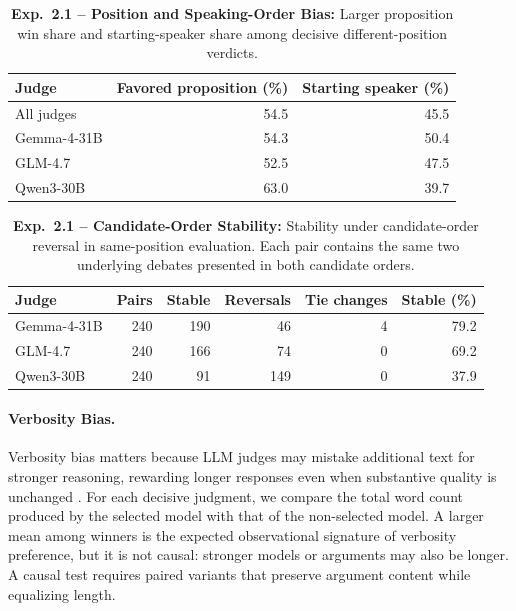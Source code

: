 \documentclass{article}
\begin{document}
\begin{table}[!t]
  \centering
  \caption{\textbf{Exp.~2.1 -- Position and Speaking-Order Bias:} Larger proposition win share and starting-speaker share among decisive different-position verdicts.}
  \label{tab:current-position-order}
  \begin{tabular}{p{8em}rr}
    \toprule
    Judge & Favored proposition (\%) & Starting speaker (\%) \\
    \midrule
    All judges & 54.5 & 45.5 \\
    Gemma-4-31B & 54.3 & 50.4 \\
    GLM-4.7 & 52.5 & 47.5 \\
    Qwen3-30B & 63.0 & 39.7 \\
    \bottomrule
  \end{tabular}
\end{table}

\begin{table}[!t]
  \centering
  \caption{\textbf{Exp.~2.1 -- Candidate-Order Stability:} Stability under candidate-order reversal in same-position evaluation. Each pair contains the same two underlying debates presented in both candidate orders.}
  \label{tab:current-candidate-order}
  \begin{tabular}{p{8em}rrrrr}
    \toprule
    Judge & Pairs & Stable & Reversals & Tie changes & Stable (\%) \\
    \midrule
    Gemma-4-31B & 240 & 190 & 46 & 4 & 79.2 \\
    GLM-4.7 & 240 & 166 & 74 & 0 & 69.2 \\
    Qwen3-30B & 240 & 91 & 149 & 0 & 37.9 \\
    \bottomrule
  \end{tabular}
\end{table}

\paragraph{Verbosity Bias.}
Verbosity bias matters because LLM judges may mistake additional text for stronger reasoning, rewarding longer responses even when substantive quality is unchanged \citep{zheng2023judge}. For each decisive judgment, we compare the total word count produced by the selected model with that of the non-selected model. A larger mean among winners is the expected observational signature of verbosity preference, but it is not causal: stronger models or arguments may also be longer. A causal test requires paired variants that preserve argument content while equalizing length.
\end{document}
